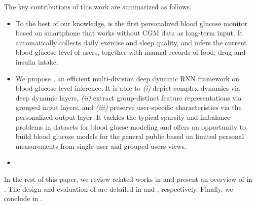 The key contributions of this work are summarized as follows.
\begin{itemize}
  \item
  To the best of our knowledge, \sysname is the first personalized blood glucose monitor based on smartphone that works without CGM data as long-term input.
  It automatically collects daily exercise and sleep quality, and infers the current blood glucose level of users,  together with manual records of food, drug and insulin intake.
  \item
  We propose \modelname, an efficient multi-division deep dynamic RNN framework on blood glucose level inference.
  It is able to \emph{(i)} depict complex dynamics via deep dynamic layers, \emph{(ii)} extract group-distinct feature representations via grouped input layers, and \emph{(iii)} preserve user-specific characteristics via the personalized output layer.
  It tackles the typical sparsity and imbalance problems in datasets for blood glucse modeling and offers an opportunity to build blood glucose models for the general public based on limited personal measurements from single-user and grouped-users views. 
  \item
\end{itemize}

In the rest of this paper, we review related works in  and present an overview of \sysname in .
The design and evaluation of \sysname are detailed in  and , respectively.
Finally, we conclude in .

